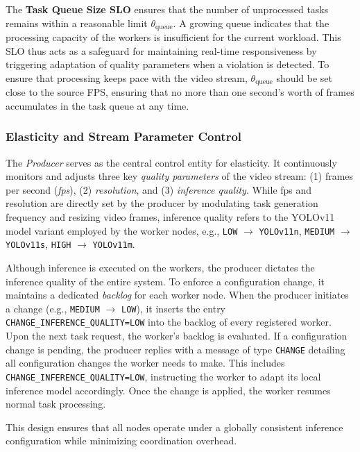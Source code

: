 The \textbf{Task Queue Size SLO} ensures that the number of unprocessed tasks remains within a reasonable limit \(\theta_\text{queue}\). A growing queue indicates that the processing capacity of the workers is insufficient for the current workload. This SLO thus acts as a safeguard for maintaining real-time responsiveness by triggering adaptation of quality parameters when a violation is detected. To ensure that processing keeps pace with the video stream, \(\theta_\text{queue}\)  should be set close to the source FPS, ensuring that no more than one second's worth of frames accumulates in the task queue at any time.

\subsubsection{Elasticity and Stream Parameter Control}
The \textit{Producer} serves as the central control entity for elasticity. It continuously monitors and adjusts three key \textit{quality parameters} of the video stream: (1) frames per second (\textit{fps}), (2) \textit{resolution}, and (3) \textit{inference quality}. While fps and resolution are directly set by the producer by modulating task generation frequency and resizing video frames, inference quality refers to the YOLOv11 model variant employed by the worker nodes, e.g., \texttt{LOW} $\rightarrow$ \texttt{YOLOv11n}, \texttt{MEDIUM} $\rightarrow$ \texttt{YOLOv11s}, \texttt{HIGH} $\rightarrow$ \texttt{YOLOv11m}.

Although inference is executed on the workers, the producer dictates the inference quality of the entire system. To enforce a configuration change, it maintains a dedicated \textit{backlog} for each worker node. When the producer initiates a change (e.g., \texttt{MEDIUM} $\rightarrow$ \texttt{LOW}), it inserts the entry \texttt{CHANGE\_INFERENCE\_QUALITY=LOW} into the backlog of every registered worker. Upon the next task request, the worker's backlog is evaluated. If a configuration change is pending, the producer replies with a message of type \texttt{CHANGE} detailing all configuration changes the worker needs to make. This includes \texttt{CHANGE\_INFERENCE\_QUALITY=LOW}, instructing the worker to adapt its local inference model accordingly. Once the change is applied, the worker resumes normal task processing.

This design ensures that all nodes operate under a globally consistent inference configuration while minimizing coordination overhead.


